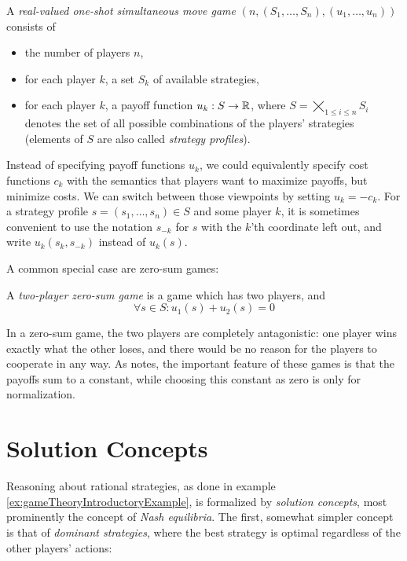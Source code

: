 \documentclass[a4paper]{scrreprt}
\begin{document}
    \begin{defn}
        A \emph{real-valued one-shot simultaneous move game} $(n, (S_1, \dots, S_n), (u_1, \dots, u_n))$ consists of 
        \begin{itemize}
            \item the number of players $n$,
            \item for each player $k$, a set $S_k$ of available strategies,
            \item for each player $k$, a payoff function $u_k: S \to \mathbb{R}$, where $S = \bigtimes\limits_{1\leq i \leq n} S_i$ denotes the set of all possible combinations of the players' strategies (elements of $S$ are also called \emph{strategy profiles}). 
        \end{itemize}
        \label{defn:realValuedGames}
    \end{defn}
    
    Instead of specifying payoff functions $u_k$, we could equivalently specify cost functions $c_k$ with the semantics that players want to maximize payoffs, but minimize costs. We can switch between those viewpoints by setting $u_k = - c_k$. For a strategy profile $s = (s_1, \dots, s_n) \in S$ and some player $k$, it is sometimes convenient to use the notation $s_{-k}$ for $s$ with the $k$'th coordinate left out, and write $u_k(s_k, s_{-k})$ instead of $u_k(s)$.
    
    A common special case are zero-sum games:
    
    \begin{defn}
        A \emph{two-player zero-sum game} is a game which has two players, and 
        \[ \forall s \in S: u_1(s) + u_2(s) = 0 \]
    \end{defn}

    In a zero-sum game, the two players are completely antagonistic: %
    one player wins exactly what the other loses, and there would be no reason for the players to cooperate in any way. As \cite{bib:fudenbergGameTheory} notes, the important feature of these games is that the payoffs sum to a constant, while choosing this constant as zero is only for normalization.
    
    \section{Solution Concepts}
    Reasoning about rational strategies, as done in example \ref{ex:gameTheoryIntroductoryExample}, is formalized by \emph{solution concepts}, most prominently the concept of \emph{Nash equilibria}. The first, somewhat simpler concept is that of \emph{dominant strategies}, where the best strategy is optimal regardless of the other players' actions:
    
\end{document}
